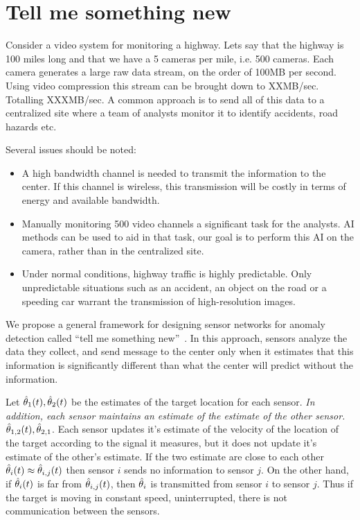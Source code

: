 \section{Tell me something new}

Consider a video system for monitoring a highway. Lets say that the
highway is 100 miles long and that we have a 5 cameras per mile,
i.e. 500 cameras. Each camera generates a large raw data stream, on
the order of 100MB per second. Using video compression this stream can
be brought down to XXMB/sec. Totalling XXXMB/sec. A common approach
is to send all of this data to a centralized site where a team of
analysts monitor it to identify accidents, road hazards etc.

Several issues should be noted:
\begin{itemize}
\item A high bandwidth channel is needed to transmit the information
  to the center. If this channel is wireless, this transmission will
  be costly in terms of energy and available bandwidth.
\item Manually monitoring 500 video channels a significant task for
  the analysts. AI methods can be used to aid in that task, our goal
  is to perform this AI on the camera, rather than in the centralized
  site.
\item Under normal conditions, highway traffic is highly
  predictable. Only unpredictable situations such as an accident, an
  object on the road or a speeding car warrant the transmission of
  high-resolution images.
\end{itemize}

We propose a general framework for designing sensor networks for
anomaly detection called ``tell me something new''~\cite{TMSN}. In
this approach, sensors analyze the data they collect, and send message
to the center only when it estimates that this information is
significantly different than what the center will predict without the
information.

Let $\hat{\theta}_1(t),\hat{\theta}_2(t)$ be the estimates of the target
location for each sensor. {\em In addition, each sensor maintains an
  estimate of the estimate of the other sensor.}
$\hat{\theta}_{1,2}(t),\hat{\theta}_{2,1}$. Each sensor updates it's estimate of
the velocity of the location of the target according to the signal it
measures, but it does not update it's estimate of the other's
estimate.  If the two estimate are close to each other $\hat{\theta}_i(t)
\approx \hat{\theta}_{i,j}(t)$ then sensor $i$ sends no information to
sensor $j$. On the other hand, if $\hat{\theta}_i(t)$ is far from
$\hat{\theta}_{i,j}(t)$, then $\hat{\theta}_{i}$ is transmitted from sensor $i$
to sensor $j$. Thus if the target is moving in constant speed,
uninterrupted, there is not communication between the sensors.

